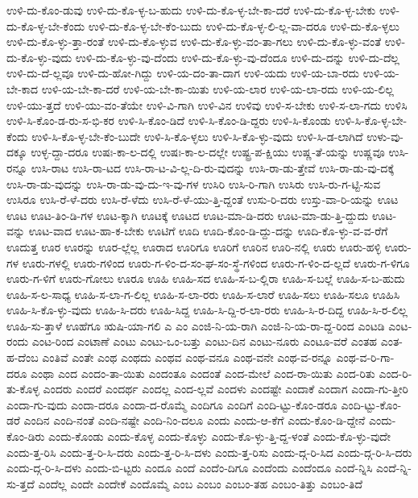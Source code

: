 {ಉಳಿ-ದು-ಕೊಂ-ಡುವು
ಉಳಿ-ದು-ಕೊ-ಳ್ಳ-ಬ-ಹುದು
ಉಳಿ-ದು-ಕೊ-ಳ್ಳ-ಬೇ-ಕಾ-ದರೆ
ಉಳಿ-ದು-ಕೊ-ಳ್ಳ-ಬೇಕು
ಉಳಿ-ದು-ಕೊ-ಳ್ಳ-ಬೇ-ಕೆಂದು
ಉಳಿ-ದು-ಕೊ-ಳ್ಳ-ಬೇ-ಕೆಂ-ಬುದು
ಉಳಿ-ದು-ಕೊ-ಳ್ಳ-ಲಿ-ಲ್ಲ-ವಾ-ದರೂ
ಉಳಿ-ದು-ಕೊ-ಳ್ಳಲು
ಉಳಿ-ದು-ಕೊ-ಳ್ಳು-ತ್ತಾ-ರಂತೆ
ಉಳಿ-ದು-ಕೊ-ಳ್ಳುವ
ಉಳಿ-ದು-ಕೊ-ಳ್ಳು-ವಂ-ತಾ-ಗಲು
ಉಳಿ-ದು-ಕೊ-ಳ್ಳು-ವಂತೆ
ಉಳಿ-ದು-ಕೊ-ಳ್ಳು-ವುದು
ಉಳಿ-ದು-ಕೊ-ಳ್ಳು-ವು-ದೆಂದು
ಉಳಿ-ದು-ಕೊ-ಳ್ಳು-ವು-ದೆಂದೂ
ಉಳಿ-ದು-ದನ್ನು
ಉಳಿ-ದು-ದೆಲ್ಲ
ಉಳಿ-ದು-ದೆ-ಲ್ಲವೂ
ಉಳಿ-ದು-ಹೋ-ಗಿದ್ದು
ಉಳಿ-ಯ-ದಂ-ತಾ-ದಾಗ
ಉಳಿ-ಯದು
ಉಳಿ-ಯ-ಬಾ-ರದು
ಉಳಿ-ಯ-ಬೇ-ಕಾದ
ಉಳಿ-ಯ-ಬೇ-ಕಾ-ದರೆ
ಉಳಿ-ಯ-ಬೇ-ಕಾ-ಯಿತು
ಉಳಿ-ಯ-ಲಾರ
ಉಳಿ-ಯ-ಲಾ-ರದು
ಉಳಿ-ಯ-ಲಿಲ್ಲ
ಉಳಿ-ಯು-ತ್ತದೆ
ಉಳಿ-ಯು-ವಂ-ತೆಯೇ
ಉಳಿ-ವಿ-ಗಾಗಿ
ಉಳಿ-ವಿನ
ಉಳಿವು
ಉಳಿ-ಸ-ಬೇಕು
ಉಳಿ-ಸ-ಲಾ-ಗದು
ಉಳಿಸಿ
ಉಳಿ-ಸಿ-ಕೊಂ-ಡ-ರು-ಸ-ಭಿ-ಕರ
ಉಳಿ-ಸಿ-ಕೊಂ-ಡಿದೆ
ಉಳಿ-ಸಿ-ಕೊಂ-ಡಿ-ದ್ದರು
ಉಳಿ-ಸಿ-ಕೊಂಡು
ಉಳಿ-ಸಿ-ಕೊ-ಳ್ಳ-ಬೇ-ಕೆಂದು
ಉಳಿ-ಸಿ-ಕೊ-ಳ್ಳ-ಬೇ-ಕೆಂ-ಬುದೇ
ಉಳಿ-ಸಿ-ಕೊ-ಳ್ಳಲು
ಉಳಿ-ಸಿ-ಕೊ-ಳ್ಳು-ವುದು
ಉಳಿ-ಸಿ-ಡ-ಲಾಗಿದೆ
ಉಳು-ವು-ದಕ್ಕೂ
ಉಳ್ಳ-ದ್ದಾ-ದರೂ
ಉಷಃ-ಕಾ-ಲ-ದಲ್ಲಿ
ಉಷಃ-ಕಾ-ಲ-ದಲ್ಲೇ
ಉಷ್ಟ್ರ-ಪ-ಕ್ಷಿಯು
ಉಷ್ಣ-ತೆ-ಯನ್ನು
ಉಷ್ಣವೂ
ಉಸಿ-ರನ್ನೂ
ಉಸಿ-ರಾಟ
ಉಸಿ-ರಾ-ಟದ
ಉಸಿ-ರಾ-ಟ-ವಿ-ಲ್ಲ-ದಿ-ರು-ವುದನ್ನು
ಉಸಿ-ರಾ-ಡು-ತ್ತೇವೆ
ಉಸಿ-ರಾ-ಡು-ವು-ದಕ್ಕೆ
ಉಸಿ-ರಾ-ಡು-ವುದನ್ನು
ಉಸಿ-ರಾ-ಡು-ವು-ದು-ಇ-ವು-ಗಳ
ಉಸಿರಿ
ಉಸಿ-ರಿ-ಗಾಗಿ
ಉಸಿರು
ಉಸಿ-ರು-ಗ-ಟ್ಟಿ-ಸುವ
ಉಸಿರೂ
ಉಸಿ-ರೆ-ಳೆ-ದರು
ಉಸಿ-ರೆ-ಳೆದು
ಉಸಿ-ರೆ-ಳೆ-ಯು-ತ್ತಿ-ದ್ದಂತೆ
ಉಸು-ರಿ-ದರು
ಉಸ್ತು-ವಾ-ರಿ-ಯನ್ನು
ಊಟ
ಊಟ
ಊಟ-ತಿಂ-ಡಿ-ಗಳ
ಊಟ-ಕ್ಕಾಗಿ
ಊಟಕ್ಕೆ
ಊಟದ
ಊಟ-ಮಾ-ಡಿ-ದರು
ಊಟ-ಮಾ-ಡು-ತ್ತಿ-ದ್ದುದು
ಊಟ-ವನ್ನು
ಊಟ-ವಾದ
ಊಟ-ಹಾ-ಕ-ಬೇಕು
ಊಟಿಗೆ
ಊದಿ
ಊದಿ-ಕೊಂ-ಡಿ-ದ್ದು-ದನ್ನು
ಊದಿ-ಕೊ-ಳ್ಳು-ವ-ವ-ರೆಗೆ
ಊದುತ್ತ
ಊರ
ಊರನ್ನು
ಊರ-ಲ್ಲೆಲ್ಲ
ಊರಾದ
ಊರಿಗೂ
ಊರಿಗೆ
ಊರಿನ
ಊರಿ-ನಲ್ಲಿ
ಊರು
ಊರು-ಹಳ್ಳಿ
ಊರು-ಗಳ
ಊರು-ಗಳಲ್ಲಿ
ಊರು-ಗಳಿಂದ
ಊರು-ಗ-ಳಿಂ-ದ-ಸಂ-ಘ-ಸಂ-ಸ್ಥೆ-ಗಳಿಂದ
ಊರು-ಗ-ಳಿಂ-ದ-ಲ್ಲದೆ
ಊರು-ಗ-ಳಿಗೂ
ಊರು-ಗ-ಳಿಗೆ
ಊರು-ಗೋಲು
ಊರೂ
ಊಹಿ
ಊಹಿ-ಸದ
ಊಹಿ-ಸ-ಬ-ಲ್ಲಿರಾ
ಊಹಿ-ಸ-ಬಲ್ಲೆ
ಊಹಿ-ಸ-ಬ-ಹುದು
ಊಹಿ-ಸ-ಲ-ಸಾಧ್ಯ
ಊಹಿ-ಸ-ಲಾ-ಗ-ಲಿಲ್ಲ
ಊಹಿ-ಸ-ಲಾ-ರರು
ಊಹಿ-ಸ-ಲಾರೆ
ಊಹಿ-ಸಲು
ಊಹಿ-ಸಲೂ
ಊಹಿಸಿ
ಊಹಿ-ಸಿ-ಕೊ-ಳ್ಳು-ವುದು
ಊಹಿ-ಸಿ-ದರು
ಊಹಿ-ಸಿದ್ದ
ಊಹಿ-ಸಿ-ದ್ದಿ-ರ-ಲಾ-ರರು
ಊಹಿ-ಸಿ-ರ-ದಿದ್ದ
ಊಹಿ-ಸಿ-ರ-ಲಿಲ್ಲ
ಊಹಿ-ಸು-ತ್ತಾಳೆ
ಊಹೆಗೂ
ಋಷಿ-ಯಾ-ಗಲಿ
ಎ
ಎಂ
ಎಂಜಿ-ನಿ-ಯ-ರಾಗಿ
ಎಂಜಿ-ನಿ-ಯ-ರಾ-ದ್ದ-ರಿಂದ
ಎಂಟಡಿ
ಎಂಟ-ರಂದು
ಎಂಟ-ರಿಂದ
ಎಂಟಾಣೆ
ಎಂಟು
ಎಂಟು-ಒಂ-ಬತ್ತು
ಎಂಟು-ದಿನ
ಎಂಟು-ನೂರು
ಎಂಟೂ-ವರೆ
ಎಂತಹ
ಎಂತ-ಹ-ದೆಂಬ
ಎಂತಿವೆ
ಎಂತೇ
ಎಂಥ
ಎಂಥದು
ಎಂಥವ
ಎಂಥ-ವನೂ
ಎಂಥ-ವನೇ
ಎಂಥ-ವ-ರನ್ನೂ
ಎಂಥ-ವ-ರಿ-ಗಾ-ದರೂ
ಎಂಥಾ
ಎಂದ
ಎಂದಂ-ತಾ-ಯಿತು
ಎಂದಂತೂ
ಎಂದಂತೆ
ಎಂದ-ಮೇಲೆ
ಎಂದ-ರಾ-ಯಿತು
ಎಂದ-ರಿತು
ಎಂದ-ರಿ-ತು-ಕೊಳ್ಳ
ಎಂದರು
ಎಂದರೆ
ಎಂದರ್ಥ
ಎಂದಲ್ಲ
ಎಂದ-ಲ್ಲವೆ
ಎಂದಳು
ಎಂದಷ್ಟೇ
ಎಂದಾಕೆ
ಎಂದಾಗ
ಎಂದಾ-ಗು-ತ್ತೀರಿ
ಎಂದಾ-ಗು-ವುದು
ಎಂದಾ-ದರೂ
ಎಂದಾ-ದ-ರೊಮ್ಮೆ
ಎಂದಿಗೂ
ಎಂದಿಗೆ
ಎಂದಿ-ಟ್ಟು-ಕೊಂ-ಡರೂ
ಎಂದಿ-ಟ್ಟು-ಕೊಂ-ಡರೆ
ಎಂದಿನ
ಎಂದಿ-ನಂತೆ
ಎಂದಿ-ನಷ್ಟೇ
ಎಂದಿ-ನಿಂ-ದಲೂ
ಎಂದು
ಎಂದು-ಆ-ಕೆಗೆ
ಎಂದು-ಕೊಂ-ಡಿ-ದ್ದೇನೆ
ಎಂದು-ಕೊಂ-ಡಿರು
ಎಂದು-ಕೊಂಡು
ಎಂದು-ಕೊಳ್ಳ
ಎಂದು-ಕೊಳ್ಳು
ಎಂದು-ಕೊ-ಳ್ಳು-ತ್ತಿ-ದ್ದ-ಳಂತೆ
ಎಂದು-ಕೊ-ಳ್ಳು-ವುದೇ
ಎಂದು-ತ್ತ-ರಿಸಿ
ಎಂದು-ತ್ತ-ರಿ-ಸಿ-ದರು
ಎಂದು-ತ್ತ-ರಿ-ಸಿ-ದಳು
ಎಂದು-ತ್ತ-ರಿಸು
ಎಂದು-ದ್ಗ-ರಿ-ಸಿದ
ಎಂದು-ದ್ಗ-ರಿ-ಸಿ-ದರು
ಎಂದು-ದ್ಗ-ರಿ-ಸಿ-ದಳು
ಎಂದು-ಬಿ-ಟ್ಟರು
ಎಂದೂ
ಎಂದೆ
ಎಂದೆಂ-ದಿಗೂ
ಎಂದೆಂದು
ಎಂದೆಂದೂ
ಎಂದೆ-ನ್ನಿಸಿ
ಎಂದೆ-ನ್ನಿ-ಸು-ತ್ತದೆ
ಎಂದೆಲ್ಲ
ಎಂದೇ
ಎಂದೇಕೆ
ಎಂದೊಮ್ಮೆ
ಎಂಬ
ಎಂಬಂ
ಎಂಬಂ-ತಹ
ಎಂಬಂ-ತಿತ್ತು
ಎಂಬಂ-ತಿದೆ
}
